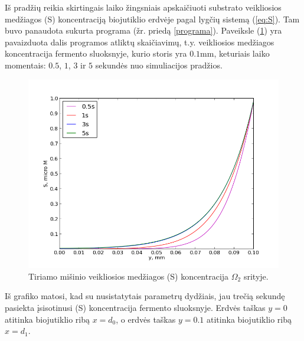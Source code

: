 \documentclass[12pt, a4paper, lithuanian]{article}
\begin{document}
Iš pradžių reikia skirtingais laiko žingsniais apskaičiuoti substrato veikliosios
medžiagos (S) koncentraciją biojutiklio erdvėje pagal lygčių sistemą (\ref{eq:S}).
Tam buvo panaudota sukurta programa (žr. priedą \ref{programa}). Paveiksle (\ref{img:S}) 
yra pavaizduota dalis programos atliktų skaičiavimų, t.y. veikliosios medžiagos koncentracija
fermento sluoksnyje, kurio storis yra $0.1$mm, keturiais laiko momentais: $0.5$, $1$,
$3$ ir $5$ sekundės nuo simuliacijos pradžios.
 \begin{figure}[H]
     \centering
     \includegraphics[scale=0.5]{img/kurS}
     \caption{Tiriamo mišinio veikliosios medžiagos (S) koncentracija
     $\Omega_2$ srityje.}
     \label{img:S}
 \end{figure}

Iš grafiko matosi, kad su nusistatytais parametrų dydžiais, jau trečią sekundę
pasiekta įsisotinusi (S) koncentracija fermento sluoksnyje. Erdvės taškas $y = 0$
atitinka biojutiklio ribą $x = d_0$, o erdvės taškas $y = 0.1$ atitinka
biojutiklio ribą $x = d_1$.
\end{document}
